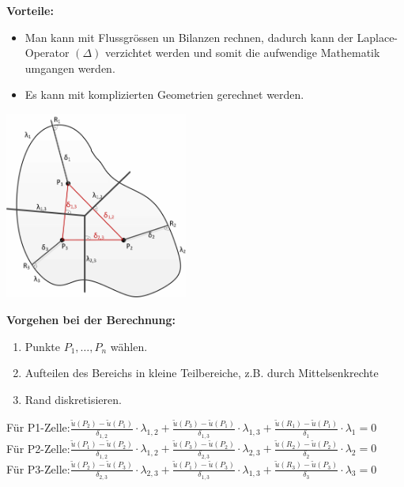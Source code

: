 \textbf{Vorteile:}\\
\begin{itemize}
\item Man kann mit Flussgrössen un Bilanzen rechnen, dadurch kann der Laplace-Operator $(\Delta)$ verzichtet werden und somit die aufwendige Mathematik umgangen werden.
\item Es kann mit komplizierten Geometrien gerechnet werden.  
\end{itemize}

\begin{minipage}{6cm}
	\includegraphics[width=6cm]{Content/Numerik/FVM1.png}
\end{minipage}
\hfill
\begin{minipage}{12cm}
\textbf{Vorgehen bei der Berechnung:}\\
\begin{enumerate}
\item Punkte $P_1,\ldots,P_n$ wählen.
\item Aufteilen des Bereichs in kleine Teilbereiche, z.B. durch Mittelsenkrechte
\item Rand diskretisieren.\\
\end{enumerate}

Für P1-Zelle:\quad $\frac{\tilde{u}(P_2)-\tilde{u}(P_1)}{\delta_{1,2}}\cdot\lambda_{1,2}+\frac{\tilde{u}(P_3)-\tilde{u}(P_1)}{\delta_{1,3}}\cdot\lambda_{1,3}+\frac{\tilde{u}(R_1)-\tilde{u}(P_1)}{\delta_1}\cdot\lambda_1=0$\\

Für P2-Zelle:\quad $\frac{\tilde{u}(P_1)-\tilde{u}(P_2)}{\delta_{1,2}}\cdot\lambda_{1,2}+\frac{\tilde{u}(P_3)-\tilde{u}(P_2)}{\delta_{2,3}}\cdot\lambda_{2,3}+\frac{\tilde{u}(R_2)-\tilde{u}(P_2)}{\delta_2}\cdot\lambda_2=0$\\

Für P3-Zelle:\quad $\frac{\tilde{u}(P_2)-\tilde{u}(P_3)}{\delta_{2,3}}\cdot\lambda_{2,3}+\frac{\tilde{u}(P_1)-\tilde{u}(P_3)}{\delta_{1,3}}\cdot\lambda_{1,3}+\frac{\tilde{u}(R_3)-\tilde{u}(P_3)}{\delta_3}\cdot\lambda_3=0$\\
\end{minipage}

